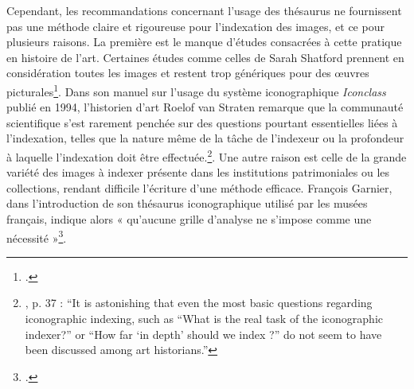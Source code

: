 Cependant, les recommandations concernant l’usage des thésaurus ne fournissent pas une méthode claire et rigoureuse pour l’indexation des images, et ce pour plusieurs raisons. La première est le manque d’études consacrées à cette pratique en histoire de l'art. Certaines études comme celles de Sarah Shatford prennent en considération toutes les images et restent trop génériques pour des œuvres picturales\footcites{shatfordDescribingPictureThousand1984}{shatfordAnalyzingSubjectPicture1986}. Dans son manuel sur l’usage du système iconographique \textit{Iconclass} publié en 1994, l'historien d'art Roelof van Straten remarque que la communauté scientifique s’est rarement penchée sur des questions pourtant essentielles liées à l’indexation, telles que la nature même de la tâche de l’indexeur ou la profondeur à laquelle l’indexation doit être effectuée.\footnote{\cite{vanstratenIconographyIndexingIconclass1994}, p. 37 : “It is astonishing that even the most basic questions regarding iconographic indexing, such as “What is the real task of the iconographic indexer?” or “How far ‘in depth’ should we index ?” do not seem to have been discussed among art historians.”}. Une autre raison est celle de la grande variété des images à indexer présente dans les institutions patrimoniales ou les collections, rendant difficile l’écriture d’une méthode efficace. François Garnier, dans l'introduction de son thésaurus iconographique utilisé par les musées français, indique alors « qu'aucune grille d'analyse ne s'impose comme une nécessité »\footcite[p. 25]{garnierThesaurusIconographiqueSysteme1984}. 

